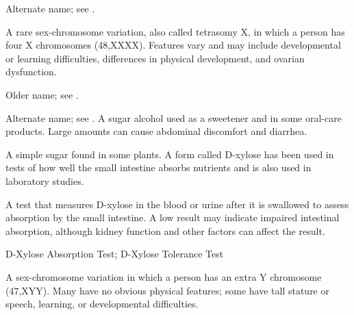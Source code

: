  Alternate name; see .

 A rare sex-chromosome variation, also called tetrasomy X, in which a person has four X chromosomes (48,XXXX). Features vary and may include developmental or learning difficulties, differences in physical development, and ovarian dysfunction.

 Older name; see .

 Alternate name; see .
 A sugar alcohol used as a sweetener and in some oral-care products. Large amounts can cause abdominal discomfort and diarrhea.

 A simple sugar found in some plants. A form called D-xylose has been used in tests of how well the small intestine absorbs nutrients and is also used in laboratory studies.

 A test that measures D-xylose in the blood or urine after it is swallowed to assess absorption by the small intestine. A low result may indicate impaired intestinal absorption, although kidney function and other factors can affect the result.

\synonyms
D-Xylose Absorption Test; D-Xylose Tolerance Test

 A sex-chromosome variation in which a person has an extra Y chromosome (47,XYY). Many have no obvious physical features; some have tall stature or speech, learning, or developmental difficulties.
